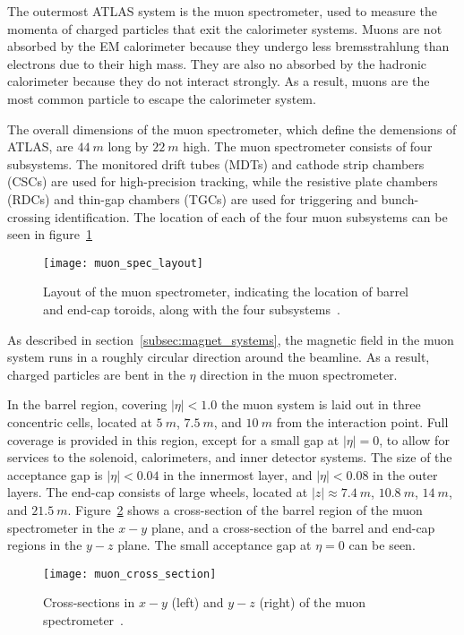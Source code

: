The outermost ATLAS system is the muon spectrometer, used to measure the momenta of charged particles that exit the calorimeter systems.
Muons are not absorbed by the EM calorimeter because they undergo less bremsstrahlung than electrons due to their high mass.
They are also no absorbed by the hadronic calorimeter because they do not interact strongly.
As a result, muons are the most common particle to escape the calorimeter system.

The overall dimensions of the muon spectrometer, which define the demensions of ATLAS, are $44~m$ long by $22~m$ high.
The muon spectrometer consists of four subsystems.
The monitored drift tubes (MDTs) and cathode strip chambers (CSCs) are used for high-precision tracking,
while the resistive plate chambers (RDCs) and thin-gap chambers (TGCs) are used for triggering and bunch-crossing identification.
The location of each of the four muon subsystems can be seen in figure~\ref{fig:muon_spec_layout}

\begin{figure}[!ht]\centering
\texttt{[image: muon\_spec\_layout]}
\caption{Layout of the muon spectrometer, indicating the location of barrel and end-cap toroids, along with the four subsystems~\cite{atlas-detector-2008}.}
\label{fig:muon_spec_layout}
\end{figure}

As described in section~\ref{subsec:magnet_systems}, the magnetic field in the muon system runs in a roughly circular direction around the beamline.
As a result, charged particles are bent in the $\eta$ direction in the muon spectrometer.

In the barrel region, covering $|\eta| < 1.0$ the muon system is laid out in three concentric cells,
located at $5~m$, $7.5~m$, and $10~m$ from the interaction point.
Full coverage is provided in this region, except for a small gap at $|\eta| = 0$, to allow for services to the solenoid,
calorimeters, and inner detector systems.
The size of the acceptance gap is $|\eta| < 0.04$ in the innermost layer, and $|\eta| < 0.08$ in the outer layers.
The end-cap consists of large wheels, located at $|z| \approx 7.4~m$, $10.8~m$, $14~m$, and $21.5~m$.
Figure~\ref{fig:muon_cross_section} shows a cross-section of the barrel region of the muon spectrometer in the $x-y$ plane,
and a cross-section of the barrel and end-cap regions in the $y-z$ plane.
The small acceptance gap at $\eta = 0$ can be seen.

\begin{figure}[!ht]\centering
\texttt{[image: muon\_cross\_section]}
\caption{Cross-sections in $x-y$ (left) and $y-z$ (right) of the muon spectrometer~\cite{muon-2003}.}
\label{fig:muon_cross_section}
\end{figure}

